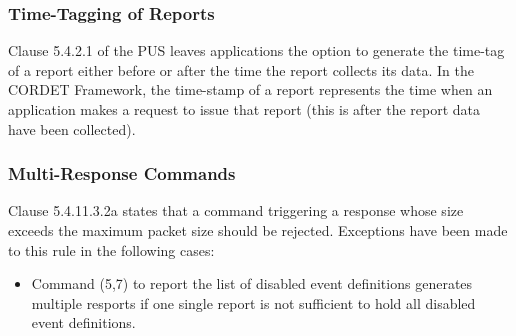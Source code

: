 \documentclass{pnp_article}
\begin{document}
\subsubsection{Time-Tagging of Reports}
Clause 5.4.2.1 of the PUS leaves applications the option to generate the time-tag of a report either before or after the time the report collects its data. In the CORDET Framework, the time-stamp of a report represents the time when an application makes a request to issue that report (this is after the report data have been collected). 

\subsubsection{Multi-Response Commands}
Clause 5.4.11.3.2a states that a command triggering a response whose size exceeds the maximum packet size should be rejected. Exceptions have been made to this rule in the following cases:

\begin{itemize}
\item Command (5,7) to report the list of disabled event definitions generates multiple resports if one single report is not sufficient to hold all disabled event definitions.
\end{itemize}
\end{document}
